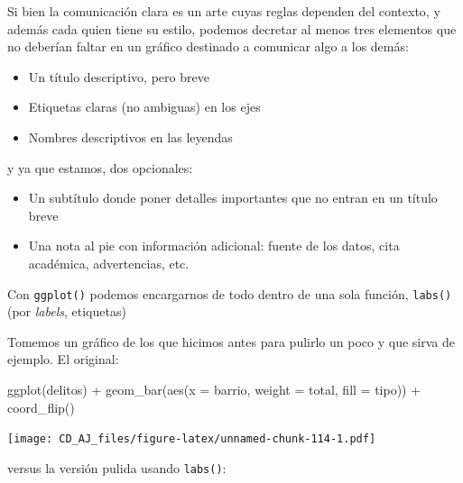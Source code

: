 \documentclass[
]{book}
\newenvironment{Shaded}{\begin{snugshade}}{\end{snugshade}}
\newcommand{\AttributeTok}[1]{\textcolor[rgb]{0.77,0.63,0.00}{#1}}
\newcommand{\FunctionTok}[1]{\textcolor[rgb]{0.00,0.00,0.00}{#1}}
\newcommand{\NormalTok}[1]{#1}
\newcommand{\SpecialCharTok}[1]{\textcolor[rgb]{0.00,0.00,0.00}{#1}}
\providecommand{\tightlist}{%
  \setlength{\itemsep}{0pt}\setlength{\parskip}{0pt}}
\begin{document}
Si bien la comunicación clara es un arte cuyas reglas dependen del contexto, y además cada quien tiene su estilo, podemos decretar al menos tres elementos que no deberían faltar en un gráfico destinado a comunicar algo a los demás:

\begin{itemize}
\tightlist
\item
  Un título descriptivo, pero breve
\item
  Etiquetas claras (no ambiguas) en los ejes
\item
  Nombres descriptivos en las leyendas
\end{itemize}

y ya que estamos, dos opcionales:

\begin{itemize}
\tightlist
\item
  Un subtítulo donde poner detalles importantes que no entran en un título breve
\item
  Una nota al pie con información adicional: fuente de los datos, cita académica, advertencias, etc.
\end{itemize}

Con \texttt{ggplot()} podemos encargarnos de todo dentro de una sola función, \texttt{labs()} (por \emph{labels}, etiquetas)

Tomemos un gráfico de los que hicimos antes para pulirlo un poco y que sirva de ejemplo. El original:

\begin{Shaded}
\begin{Highlighting}[]
\FunctionTok{ggplot}\NormalTok{(delitos) }\SpecialCharTok{+}
    \FunctionTok{geom\_bar}\NormalTok{(}\FunctionTok{aes}\NormalTok{(}\AttributeTok{x =}\NormalTok{ barrio, }\AttributeTok{weight =}\NormalTok{ total, }\AttributeTok{fill =}\NormalTok{ tipo)) }\SpecialCharTok{+}
    \FunctionTok{coord\_flip}\NormalTok{()}
\end{Highlighting}
\end{Shaded}

\texttt{[image: CD\_AJ\_files/figure-latex/unnamed-chunk-114-1.pdf]}

versus la versión pulida usando \texttt{labs()}:
\end{document}

